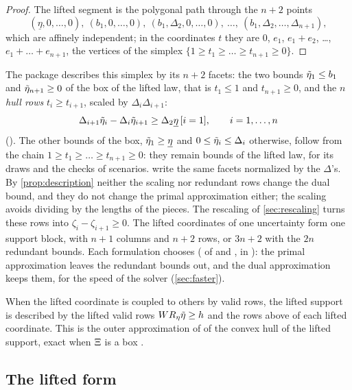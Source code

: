 \begin{proof}
The lifted segment is the polygonal path through the $n+2$ points
\[
(\underline\eta, 0, \dots, 0),\ (b_1, 0, \dots, 0),\ (b_1, \Delta_2, 0, \dots, 0),\ \dots,\ (b_1, \Delta_2, \dots, \Delta_{n+1}),
\]
which are affinely independent; in the coordinates $t$ they are $0$, $e_1$, $e_1 + e_2$, \dots, $e_1 + \dots + e_{n+1}$,
the vertices of the simplex $\{1 \ge t_1 \ge \dots \ge t_{n+1} \ge 0\}$.
\end{proof}

The package describes this simplex by its $n+2$ facets:
the two bounds $\tilde\eta_1 \le b_1$ and $\tilde\eta_{n+1} \ge 0$ of the box of the lifted law, that is $t_1 \le 1$ and $t_{n+1} \ge 0$,
and the $n$ \emph{hull rows} $t_i \ge t_{i+1}$, scaled by $\Delta_i\Delta_{i+1}$:
\[
\Delta_{i+1}\tilde\eta_i - \Delta_i\tilde\eta_{i+1} \ge \Delta_2\underline\eta\, [i = 1], \qquad i = 1, \dots, n
\]
().
The other bounds of the box, $\tilde\eta_1 \ge \underline\eta$ and $0 \le \tilde\eta_i \le \Delta_i$ otherwise, follow from the chain $1 \ge t_1 \ge \dots \ge t_{n+1} \ge 0$:
they remain bounds of the lifted law, for its draws and the checks of scenarios.
\citet[Lemma~4.3]{GWK2015} write the same facets normalized by the $\Delta$'s.
By \cref{prop:description} neither the scaling nor redundant rows change the dual bound, and they do not change the primal approximation either;
the scaling avoids dividing by the lengths of the pieces.
The rescaling of \cref{sec:rescaling} turns these rows into $\zeta_i - \zeta_{i+1} \ge 0$.
The lifted coordinates of one uncertainty form one support block, with $n+1$ columns and $n+2$ rows,
or $3n+2$ with the $2n$ redundant bounds.
Each formulation chooses ( of  and , in ):
the primal approximation leaves the redundant bounds out, and the dual approximation keeps them, for the speed of the solver (\cref{sec:faster}).

When the lifted coordinate is coupled to others by valid rows, the lifted support is described by the lifted valid rows $WR_\eta\tilde\eta \ge h$ and the rows above of each lifted coordinate.
This is the outer approximation of \citet[(10)]{GWK2015} of the convex hull of the lifted support, exact when $\Xi$ is a box \citep[Theorem~4.4]{GWK2015}.

\subsection{The lifted form}

